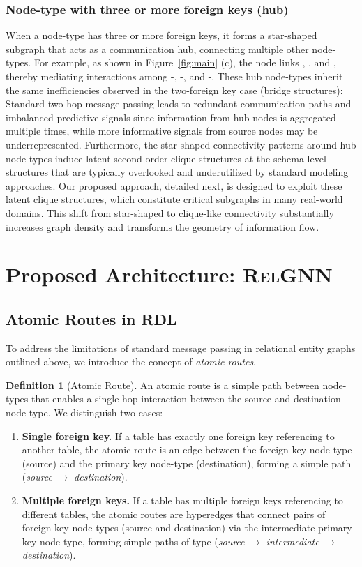 \documentclass{article}
\newcommand{\method}{\textsc{RelGNN}}
\theoremstyle{plain}
\theoremstyle{definition}
\newtheorem{definition}[theorem]{Definition}
\theoremstyle{remark}
\begin{document}
\subsubsection{Node-type with three or more foreign keys (hub)} 
 When a node-type has three or more foreign keys, it forms a star-shaped subgraph that acts as a communication hub, connecting multiple other node-types. For example, as shown in Figure~\ref{fig:main} (c), the \res node links \constructor, \race, and \driver, thereby mediating interactions among \constructor-\race, \race-\driver, and \constructor-\driver. 
These hub node-types inherit the same inefficiencies observed in the two-foreign key case (bridge structures): Standard two-hop message passing leads to redundant communication paths and imbalanced predictive signals since information from hub nodes is aggregated multiple times, while more informative signals from source nodes may be underrepresented. Furthermore, the star-shaped connectivity patterns around hub node-types induce latent second-order clique structures at the schema level—structures that are typically overlooked and underutilized by standard modeling approaches. Our proposed approach, detailed next, is designed to exploit these latent clique structures, which constitute critical subgraphs in many real-world domains. This shift from star-shaped to clique-like connectivity substantially increases graph density and transforms the geometry of information flow.

\section{Proposed Architecture: \method}
\label{sec: method}
\subsection{Atomic Routes in RDL}
\label{sec: method-atomic}
To address the limitations of standard message passing in relational entity graphs outlined above, we introduce the concept of \emph{atomic routes}.

\begin{definition}[Atomic Route]
\label{def:atomic_routes}
An atomic route is a simple path between node-types that enables a single-hop interaction between the source and destination node-type. We distinguish two cases:
\begin{enumerate}
    \item \textbf{Single foreign key.} If a table has exactly one foreign key referencing to another table, the atomic route is an edge between the foreign key node-type (source) and the primary key node-type (destination), forming a simple path (\textit{source} $\rightarrow$ \textit{destination}).
    \item \textbf{Multiple foreign keys.} If a table has multiple foreign keys referencing to different tables, the atomic routes are hyperedges that connect pairs of foreign key node-types (source and destination) via the intermediate primary key node-type, forming simple paths of type (\textit{source} $\rightarrow$ \textit{intermediate} $\rightarrow$ \textit{destination}).
\end{enumerate}
\end{definition}
\end{document}
